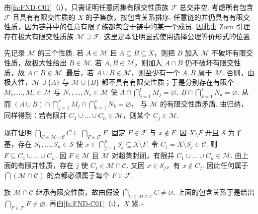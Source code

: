 \begin{FAProof}
由\autoref{fa:FND-C01}（i），只需证明任意闭集有限交性质族 \(\displaystyle \mathcal F\) 总交非空. 考虑所有包含 \(\displaystyle \mathcal F\) 且具有有限交性质的 \(\displaystyle X\) 的子集族，按包含关系排序. 任意链的并仍具有有限交性质，因为链并中的任意有限子族都包含于链中的某一个成员. 因此由 Zorn 引理存在极大有限交性质族 \(\displaystyle \mathcal M\supseteq\mathcal F\). 这里是本证明显式使用选择公理等价形式的位置.

先记录 \(\displaystyle \mathcal M\) 的三个性质. 若 \(\displaystyle A\in\mathcal M\) 且 \(\displaystyle A\subseteq B\subseteq X\)，则把 \(\displaystyle B\) 加入 \(\displaystyle \mathcal M\) 不破坏有限交性质，故极大性给出 \(\displaystyle B\in\mathcal M\). 若 \(\displaystyle A,B\in\mathcal M\)，则加入 \(\displaystyle A\cap B\) 仍不破坏有限交性质，故 \(\displaystyle A\cap B\in\mathcal M\). 最后，若 \(\displaystyle A\cup B\in\mathcal M\)，则至少有一个 \(\displaystyle A,B\) 属于 \(\displaystyle \mathcal M\). 否则，由极大性，\(\displaystyle \mathcal M\cup\{A\}\) 与 \(\displaystyle \mathcal M\cup\{B\}\) 都不具有有限交性质；于是分别存在有限个 \(\displaystyle M_1,\dots,M_r\in\mathcal M\) 与 \(\displaystyle N_1,\dots,N_s\in\mathcal M\) 使 \(\displaystyle A\cap\bigcap_{j=1}^{r}M_j=\varnothing, \; B\cap\bigcap_{k=1}^{s}N_k=\varnothing\).
从而 \(\displaystyle (A\cup B)\cap\bigcap_{j=1}^{r}M_j\cap\bigcap_{k=1}^{s}N_k=\varnothing\)，
与 \(\displaystyle \mathcal M\) 的有限交性质矛盾. 由归纳，同样得到：若有限并 \(\displaystyle C_1\cup\dots\cup C_n\in\mathcal M\)，则某个 \(\displaystyle C_j\in\mathcal M\).

现在证明 \(\displaystyle \bigcap_{C\in\mathcal M\cap\mathcal C}C \subseteq \bigcap_{F\in\mathcal F}F\).
固定 \(\displaystyle F\in\mathcal F\) 与 \(\displaystyle x\notin F\). 因 \(\displaystyle X\setminus F\) 开且 \(\displaystyle \mathcal S\) 为子基，存在 \(\displaystyle S_1,\dots,S_n\in\mathcal S\) 使 \(\displaystyle x\in\bigcap_{j=1}^{n}S_j\subseteq X\setminus F\).
令 \(\displaystyle C_j=X\setminus S_j\in\mathcal C\). 则 \(\displaystyle F\subseteq C_1\cup\dots\cup C_n\). 因 \(\displaystyle F\in\mathcal M\) 且 \(\displaystyle \mathcal M\) 对超集封闭，有限并 \(\displaystyle C_1\cup\dots\cup C_n\in\mathcal M\). 由上面的有限并性质，存在 \(\displaystyle j\) 使 \(\displaystyle C_j\in\mathcal M\cap\mathcal C\). 又因 \(\displaystyle x\in S_j\)，有 \(\displaystyle x\notin C_j\). 因此任何属于 \(\displaystyle \bigcap(\mathcal M\cap\mathcal C)\) 的点都必须属于每个 \(\displaystyle F\in\mathcal F\).

族 \(\displaystyle \mathcal M\cap\mathcal C\) 继承有限交性质，故由假设
\(\displaystyle \bigcap_{C\in\mathcal M\cap\mathcal C}C\neq\varnothing\).
上面的包含关系于是给出 \(\displaystyle \bigcap_{F\in\mathcal F}F\neq\varnothing\). 再由\autoref{fa:FND-C01}（i），\(\displaystyle X\) 紧.\hfill\(\square\)
\end{FAProof}

